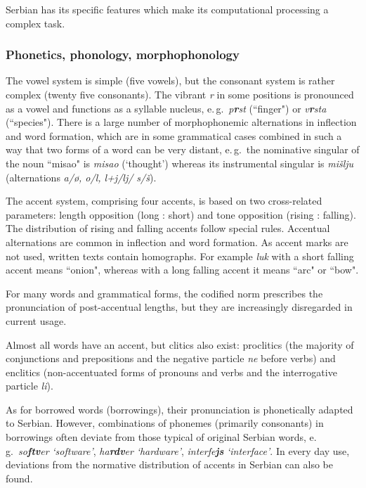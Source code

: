 {\begin{multicols}{2}
Serbian has its specific features which make its computational processing a complex task. 

\subsubsection {Phonetics, phonology, morphophonology}

The vowel system is simple (five vowels), but the consonant system is rather complex (twenty five consonants). The vibrant \textit{r} in some positions is pronounced as a vowel and functions as a syllable nucleus, e.\,g.~\textit{p\textbf{r}st} (``finger") or \textit{v\textbf{r}sta} (``species"). There is a large number of morphophonemic alternations in inflection and word formation, which are in some grammatical cases combined in such a way that two forms of a word can be very distant, e.\,g.~the nominative singular of the noun ``misao" is \textit{misao} (‘thought’) whereas its instrumental singular is \textit{mišlju} (alternations \textit{a/\o{}, o/l, l+j/lj/ s/š}).

The accent system, comprising four accents, is based on two cross-related parameters: length opposition (long : short) and tone opposition (rising : falling). The distribution of rising and falling accents follow special rules. Accentual alternations are common in inflection and word formation. As accent marks are not used, written texts contain homographs. For example \textit{luk} with a short falling accent means ``onion", whereas with a long falling accent it means ``arc" or ``bow". 

For many words and grammatical forms, the codified norm prescribes the pronunciation of post-accentual lengths, but they are increasingly disregarded in current usage.

Almost all words have an accent, but clitics also exist: proclitics (the majority of conjunctions and prepositions and the negative particle \textit{ne} before verbs) and enclitics (non-accentuated forms of pronouns and verbs and the interrogative particle \textit{li}). 

As for borrowed words (borrowings), their pronunciation is phonetically adapted to Serbian. However, combinations of phonemes (primarily consonants) in borrowings often deviate from those typical of original Serbian words, e.\,g.~\textit{so\textbf{ftv}er} \textit{‘software’}, \textit{ha\textbf{rdv}er} \textit{‘hardware’}, \textit{interfe\textbf{js}} \textit{‘interface’}. In every day use, deviations from the normative distribution of accents in Serbian can also be found. 


\end{multicols}}
